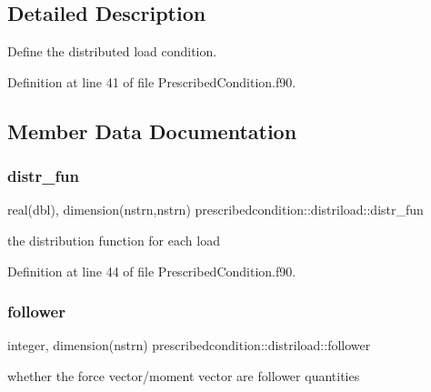 \subsection{Detailed Description}
Define the distributed load condition. 

Definition at line 41 of file Prescribed\+Condition.\+f90.



\subsection{Member Data Documentation}
\mbox{\label{structprescribedcondition_1_1distriload_ac5734eaac28c08f44fd4f41857df75b2}} 
\subsubsection{\texorpdfstring{distr\+\_\+fun}{distr\_fun}}
{\footnotesize\ttfamily real(dbl), dimension(nstrn,nstrn) prescribedcondition\+::distriload\+::distr\+\_\+fun\hspace{0.3cm}{\ttfamily [private]}}



the distribution function for each load 



Definition at line 44 of file Prescribed\+Condition.\+f90.

\mbox{\label{structprescribedcondition_1_1distriload_a476acfacfaac7a9d8ebaf6ce371279ff}} 
\subsubsection{\texorpdfstring{follower}{follower}}
{\footnotesize\ttfamily integer, dimension(nstrn) prescribedcondition\+::distriload\+::follower\hspace{0.3cm}{\ttfamily [private]}}



whether the force vector/moment vector are follower quantities 



